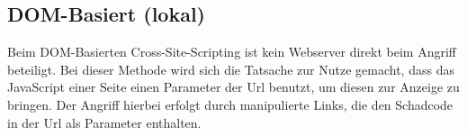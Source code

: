 \subsection{DOM-Basiert (lokal)}
Beim DOM-Basierten Cross-Site-Scripting ist kein Webserver direkt beim Angriff
beteiligt. Bei dieser Methode wird sich die Tatsache zur Nutze gemacht, dass das
JavaScript einer Seite einen Parameter der Url benutzt, um diesen zur Anzeige zu
bringen. Der Angriff hierbei erfolgt durch manipulierte Links, die den Schadcode
in der Url als Parameter enthalten. 
